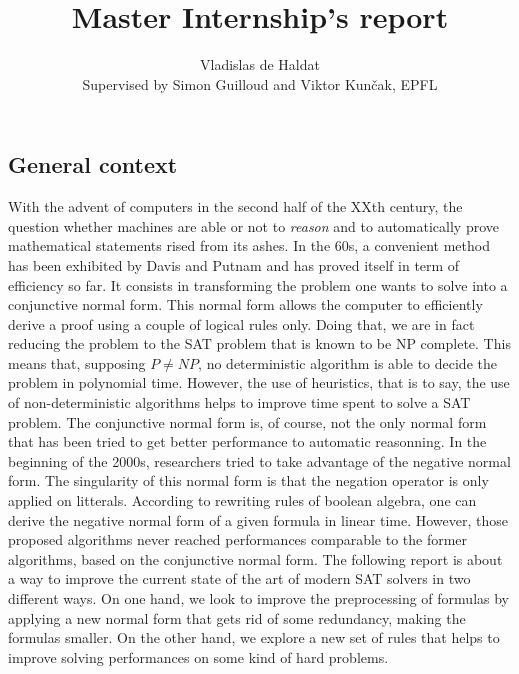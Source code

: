 \documentclass[a4paper, 11pt]{article}
\title{Master Internship's report}
\author{Vladislas de Haldat\\\small{Supervised by Simon Guilloud and Viktor Kunčak, EPFL}}
\begin{document}
    \maketitle

	\subsection*{General context}
	With the advent of computers in the second half of the XXth century, the question whether 
	machines are able or not to \textit{reason} and to automatically prove mathematical statements 
	rised from its ashes. In the 60s, a convenient method has been exhibited by Davis and Putnam
	and has proved itself in term of efficiency so far. It consists in transforming the problem one
	wants to solve into a conjunctive normal form. This normal form allows the computer to
	efficiently derive a proof using a couple of logical rules only. Doing that, we are in fact
	reducing the problem to the SAT problem that is known to be NP complete. This means that,
	supposing $P\neq NP$, no deterministic algorithm is able to decide the problem in polynomial
	time. However, the use of heuristics, that is to say, the use of non-deterministic algorithms
	helps to improve time spent to solve a SAT problem. The conjunctive normal form is, of course,
	not the only normal form that has been tried to get better performance to automatic reasonning.
	In the beginning of the 2000s, researchers tried to take advantage of the negative normal form.
	The singularity of this normal form is that the negation operator is only applied on litterals.
	According to rewriting rules of boolean algebra, one can derive the negative normal form of a
	given formula in linear time. However, those proposed algorithms never reached performances
	comparable to the former algorithms, based on the conjunctive normal form. The following report
	is about a way to improve the current state of the art of modern SAT solvers in two different
	ways. On one hand, we look to improve the preprocessing of formulas by applying a new normal
	form that gets rid of some redundancy, making the formulas smaller. On the other hand, we explore
	a new set of rules that helps to improve solving performances on some kind of hard problems.

\end{document}
